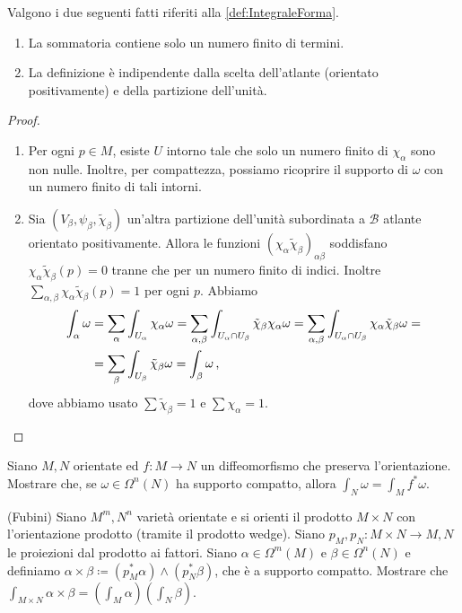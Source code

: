 \begin{proposition}
	Valgono i due seguenti fatti riferiti alla \cref{def:IntegraleForma}.
	\begin{enumerate}
		\item La sommatoria contiene solo un numero finito di termini.
		\item La definizione è indipendente dalla scelta dell'atlante (orientato positivamente) e della partizione dell'unità.
	\end{enumerate}
\end{proposition}
\begin{proof}
	\begin{enumerate}
		\item Per ogni $p\in M$, esiste $U$ intorno tale che solo un numero finito di $\chi_\alpha$ sono non nulle. Inoltre, per compattezza, possiamo ricoprire il supporto di $\omega$ con un numero finito di tali intorni.
		
		\item Sia $(V_\beta, \psi_\beta, \tilde \chi_\beta)$ un'altra partizione dell'unità subordinata a $\mathcal B$ atlante orientato positivamente. Allora le funzioni $(\chi_\alpha \tilde\chi_\beta)_{\alpha\beta}$ soddisfano $\chi_\alpha \tilde\chi_\beta(p) = 0$ tranne che per un numero finito di indici. Inoltre $\sum_{\alpha,\beta} \chi_\alpha \tilde\chi_\beta(p) = 1$ per  ogni $p$.
		Abbiamo
		\begin{align*}
			\int_\alpha \omega &= \sum_\alpha \int_{U_\alpha}\chi_\alpha \omega = \sum_{\alpha,\beta} \int_{U_\alpha \cap U_\beta} \tilde \chi_\beta \chi_\alpha \omega =\sum_{\alpha,\beta} \int_{U_\alpha\cap U_\beta}  \chi_\alpha \tilde \chi_\beta \omega =\\
			&=\sum_\beta \int_{U_\beta} \tilde\chi_\beta \omega = \int_\beta \omega \, \text{, }
		\end{align*}
		dove abbiamo usato $\sum \tilde \chi_\beta = 1$ e $\sum \chi_\alpha = 1$.
	\end{enumerate}
\end{proof}

\begin{exercise}
	Siano $M,N$ orientate ed $f:M\to N$ un diffeomorfismo che preserva l'orientazione. Mostrare che, se $\omega\in\Omega^n(N)$ ha supporto compatto, allora $\int_N \omega = \int_M f^*\omega$.
\end{exercise}

\begin{exercise}
	(Fubini) Siano $M^m,N^n$ varietà orientate e si orienti il prodotto $M\times N$ con l'orientazione prodotto (tramite il prodotto wedge). Siano $p_M,p_N : M\times N \to M,N$ le proiezioni dal prodotto ai fattori.
	Siano $\alpha \in \Omega^m(M)$ e $\beta \in \Omega^n(N)$ e definiamo
	$\alpha \times \beta \coloneqq (p_M^*\alpha) \wedge (p_N^*\beta)$, che è a supporto compatto.
	Mostrare che $\int_{M\times N} \alpha \times \beta = (\int_M\alpha )( \int_N \beta)$.
\end{exercise}


